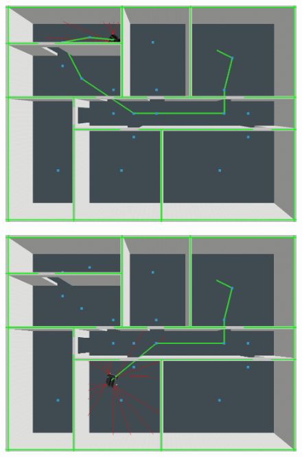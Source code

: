 \documentclass{../Vorlage/mat}
\begin{document}
\begin{figure}[!htbp]
\begin{minipage}{.5\textwidth}
  \label{fig2}
\end{minipage}
\centering
\begin{minipage}{.5\textwidth}
  \centering
  \includegraphics[scale=0.2]{astar_topleft.png}
  \label{fig3}
\end{minipage}%
\begin{minipage}{.5\textwidth}
  \centering
  \includegraphics[scale=0.21]{astar_downmiddle.png}
  \label{fig4}
\end{minipage}
\end{figure}
\end{document}
